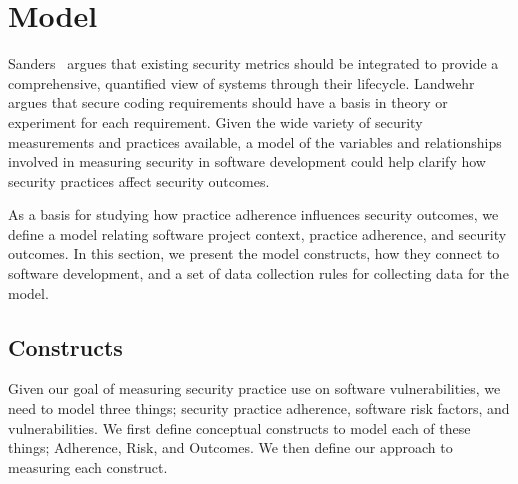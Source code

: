 \section{Model}
\label{sec:model}

Sanders~\cite{sanders2009security} argues that existing security metrics should be integrated to provide a comprehensive, quantified view of systems through their lifecycle. Landwehr~\cite{landwehr2015we} argues that secure coding requirements should have a basis in theory or experiment for each requirement. Given the wide variety of security measurements and practices available, a model of the variables and relationships involved in measuring security in software development could help clarify how security practices affect security outcomes. 

As a basis for studying how practice adherence influences security outcomes, we define a model relating software project context, practice adherence, and security outcomes. In this section, we present the model constructs, how they connect to software development, and a set of data collection rules for collecting data for the model.

\subsection{Constructs}
Given our goal of measuring security practice use on software vulnerabilities, we need to model three things; security practice adherence, software risk factors, and vulnerabilities.  We first define conceptual constructs to model each of these things; Adherence, Risk, and Outcomes. We then define our approach to measuring each construct.
